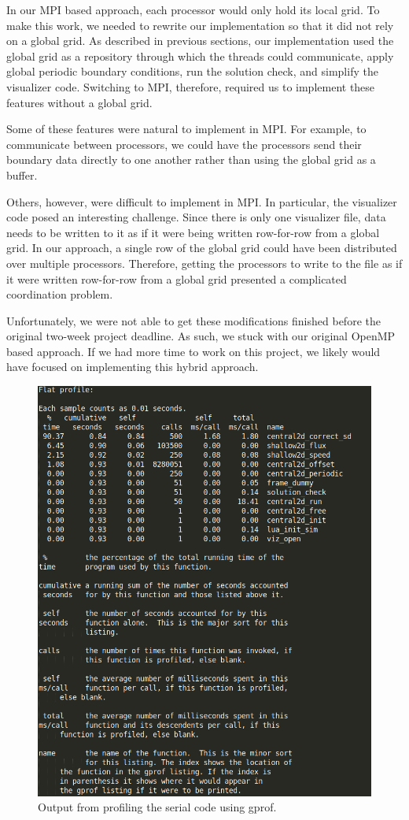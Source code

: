 \documentclass{article}
\begin{document}
In our MPI based approach, each processor would only hold its local grid.
To make this work, we needed to rewrite our implementation so that it did not rely on a global grid.
As described in previous sections, our implementation used the global grid as a repository through which the threads could communicate, apply global periodic boundary conditions, run the solution check, and simplify the visualizer code.
Switching to MPI, therefore, required us to implement these features without a global grid.

Some of these features were natural to implement in MPI.
For example, to communicate between processors, we could have the processors send their boundary data directly to one another rather than using the global grid as a buffer.

Others, however, were difficult to implement in MPI.
In particular, the visualizer code posed an interesting challenge.
Since there is only one visualizer file, data needs to be written to it as if it were being written row-for-row from a global grid.
In our approach, a single row of the global grid could have been distributed over multiple processors.
Therefore, getting the processors to write to the file as if it were written row-for-row from a global grid presented a complicated coordination problem.

Unfortunately, we were not able to get these modifications finished before the original two-week project deadline.
As such, we stuck with our original OpenMP based approach.
If we had more time to work on this project, we likely would have focused on implementing this hybrid approach.

\begin{figure}[h!]
	\centering
	\includegraphics[width=0.8\columnwidth]{../gprof_profile.png}
	\caption{Output from profiling the serial code using gprof.}
	\label{fig:gprof}
\end{figure}
\end{document}
